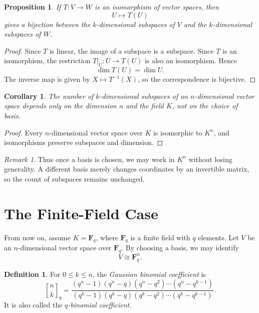 \documentclass[11pt]{article}
\newtheorem{proposition}[theorem]{Proposition}
\newtheorem{corollary}[theorem]{Corollary}
\theoremstyle{definition}
\newtheorem{definition}[theorem]{Definition}
\theoremstyle{remark}
\newtheorem{remark}[theorem]{Remark}
\newcommand{\F}{\mathbf{F}}
\newcommand{\qbinom}[2]{\genfrac{[}{]}{0pt}{}{#1}{#2}_q}
\begin{document}
	\begin{proposition}
		If \(T:V\to W\) is an isomorphism of vector spaces, then
		\[
		U \longmapsto T(U)
		\]
		gives a bijection between the \(k\)-dimensional subspaces of \(V\) and the \(k\)-dimensional subspaces of \(W\).
	\end{proposition}
	
	\begin{proof}
		Since \(T\) is linear, the image of a subspace is a subspace. Since \(T\) is an isomorphism, the restriction \(T|_U:U\to T(U)\) is also an isomorphism. Hence
		\[
		\dim T(U)=\dim U.
		\]
		The inverse map is given by \(X\mapsto T^{-1}(X)\), so the correspondence is bijective.
	\end{proof}
	
	\begin{corollary}
		The number of \(k\)-dimensional subspaces of an \(n\)-dimensional vector space depends only on the dimension \(n\) and the field \(K\), not on the choice of basis.
	\end{corollary}
	
	\begin{proof}
		Every \(n\)-dimensional vector space over \(K\) is isomorphic to \(K^n\), and isomorphisms preserve subspaces and dimension.
	\end{proof}
	
	\begin{remark}
		Thus once a basis is chosen, we may work in \(K^n\) without losing generality. A different basis merely changes coordinates by an invertible matrix, so the count of subspaces remains unchanged.
	\end{remark}
	
	\section{The Finite-Field Case}
	
	From now on, assume \(K=\F_q\), where \(\F_q\) is a finite field with \(q\) elements. Let \(V\) be an \(n\)-dimensional vector space over \(\F_q\). By choosing a basis, we may identify
	\[
	V\cong \F_q^n.
	\]
	
	\begin{definition}
		For \(0\le k\le n\), the \emph{Gaussian binomial coefficient} is
		\[
		\qbinom{n}{k}
		=
		\frac{(q^n-1)(q^n-q)(q^n-q^2)\cdots (q^n-q^{k-1})}
		{(q^k-1)(q^k-q)(q^k-q^2)\cdots (q^k-q^{k-1})}.
		\]
		It is also called the \emph{\(q\)-binomial coefficient}.
	\end{definition}
	
\end{document}
